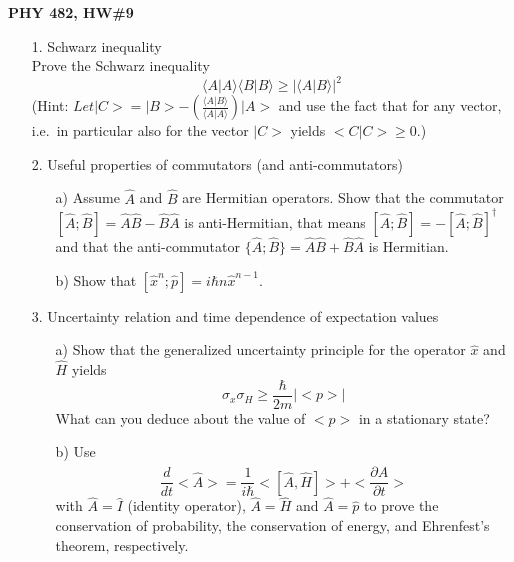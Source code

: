\documentclass[11pt]{article}
\begin{document}
\thispagestyle{empty}

\centerline{\bf PHY 482,  HW\#9}

\begin{itemize}
%
\item[1.] Schwarz inequality\\
Prove the Schwarz inequality
\begin{displaymath}
\langle A|A \rangle \langle B|B \rangle \ge |\langle A|B \rangle|^2
\end{displaymath}
(Hint: $Let |C> = |B> -\left(\frac{\langle A|B \rangle}{\langle A|A \rangle}\right) |A>$ and use the fact that for any
vector, i.e.\ in particular also for the vector $|C>$ yields $<C|C> \ge 0$.)
%
\vspace*{1cm}
%
\item[2.] Useful properties of commutators (and anti-commutators)
\begin{itemize}
\item[a)]
Assume ${\hat A}$ and ${\hat B}$ are Hermitian operators.
Show that the commutator $[{\hat A};{\hat B}] = {\hat A}{\hat B} - {\hat B}{\hat A}$ is anti-Hermitian, that means
$[{\hat A};{\hat B}] = -[{\hat A};{\hat B}]^{\dagger}$
and that the anti-commutator $\{{\hat A};{\hat B}\} = {\hat A}{\hat B} + {\hat B}{\hat A}$ is Hermitian.
\item[b)]
Show that $[{\hat x}^n; {\hat p}] = i\hbar n{\hat x}^{n-1}$.
\end{itemize}
%
\vspace*{1cm}
%
\item[3.] Uncertainty relation and time dependence of expectation values
\begin{itemize}
\item[a)]
Show that the generalized uncertainty principle for the operator ${\hat x}$ and ${\hat H}$ yields
\begin{displaymath}
\sigma_x \sigma_H \ge \frac{\hbar}{2m}|<p>|
\end{displaymath}
What can you deduce about the value of $<p>$ in a stationary state?
\item[b)]
Use
\begin{displaymath}
\frac{d}{dt}<{\hat A}> = \frac{1}{i\hbar} <[{\hat A},{\hat H}]> + <\frac{\partial {\hat A}}{\partial t}>
\end{displaymath}
with ${\hat A} = {\hat I}$ (identity operator), ${\hat A} = {\hat H}$ and ${\hat A} = {\hat p}$ to prove
the conservation of probability, the conservation of energy, and Ehrenfest's theorem, respectively.\\

\end{itemize}
\end{itemize}
\end{document}
